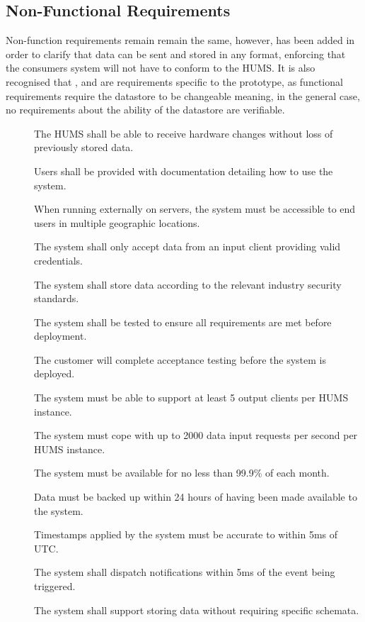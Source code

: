 \subsection{Non-Functional Requirements}
Non-function requirements remain remain the same, however,  has been added in order to clarify that data can be sent and stored in any format, enforcing that the consumers system will not have to conform to the HUMS. It is also recognised that ,  and  are requirements specific to the prototype, as functional requirements require the datastore to be changeable meaning, in the general case, no requirements about the ability of the datastore are verifiable.
\begin{description}
\item[] The HUMS shall be able to receive hardware changes without loss of previously stored data.
\item[]  Users shall be provided with documentation detailing how to use the system.
\item[] When running externally on servers, the system must be accessible to end users in multiple
geographic locations.
\item[]  The system shall only accept data from an input client providing valid credentials. 
\item[] The system shall store data according to the relevant industry security standards. 
\item[]  The system shall be tested to ensure all requirements are met before deployment.
\item[] The customer will complete acceptance testing before the system is deployed.
\item[] The system must be able to support at least 5 output clients per HUMS instance. 
\item[]  The system must cope with up to 2000 data input requests per second per HUMS instance. 
\item[] The system must be available for no less than 99.9\% of each month.
\item[]  Data must be backed up within 24 hours of having been made available to the system.
 \item[] Timestamps applied by the system must be accurate to within 5ms of UTC.
\item[]  The system shall dispatch notifications within 5ms of the event being triggered.
\item[] The system shall support storing data without requiring specific schemata.
\end{description}

